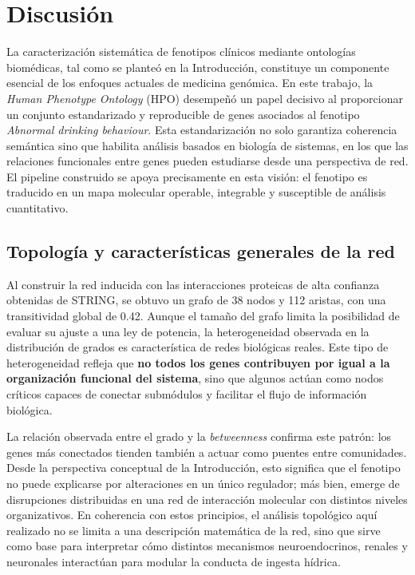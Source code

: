\section{Discusión}

La caracterización sistemática de fenotipos clínicos mediante ontologías biomédicas, tal como se planteó en la Introducción, constituye un componente esencial de los enfoques actuales de medicina genómica. En este trabajo, la \textit{Human Phenotype Ontology} (HPO) desempeñó un papel decisivo al proporcionar un conjunto estandarizado y reproducible de genes asociados al fenotipo \textit{Abnormal drinking behaviour}. Esta estandarización no solo garantiza coherencia semántica sino que habilita análisis basados en biología de sistemas, en los que las relaciones funcionales entre genes pueden estudiarse desde una perspectiva de red. El pipeline construido se apoya precisamente en esta visión: el fenotipo es traducido en un mapa molecular operable, integrable y susceptible de análisis cuantitativo.

\subsection{Topología y características generales de la red}
Al construir la red inducida con las interacciones proteicas de alta confianza obtenidas de STRING, se obtuvo un grafo de 38 nodos y 112 aristas, con una transitividad global de 0.42. Aunque el tamaño del grafo limita la posibilidad de evaluar su ajuste a una ley de potencia, la heterogeneidad observada en la distribución de grados es característica de redes biológicas reales. Este tipo de heterogeneidad refleja que \textbf{no todos los genes contribuyen por igual a la organización funcional del sistema}, sino que algunos actúan como nodos críticos capaces de conectar submódulos y facilitar el flujo de información biológica.

La relación observada entre el grado y la \textit{betweenness} confirma este patrón: los genes más conectados tienden también a actuar como puentes entre comunidades. Desde la perspectiva conceptual de la Introducción, esto significa que el fenotipo no puede explicarse por alteraciones en un único regulador; más bien, emerge de disrupciones distribuidas en una red de interacción molecular con distintos niveles organizativos. En coherencia con estos principios, el análisis topológico aquí realizado no se limita a una descripción matemática de la red, sino que sirve como base para interpretar cómo distintos mecanismos neuroendocrinos, renales y neuronales interactúan para modular la conducta de ingesta hídrica.

